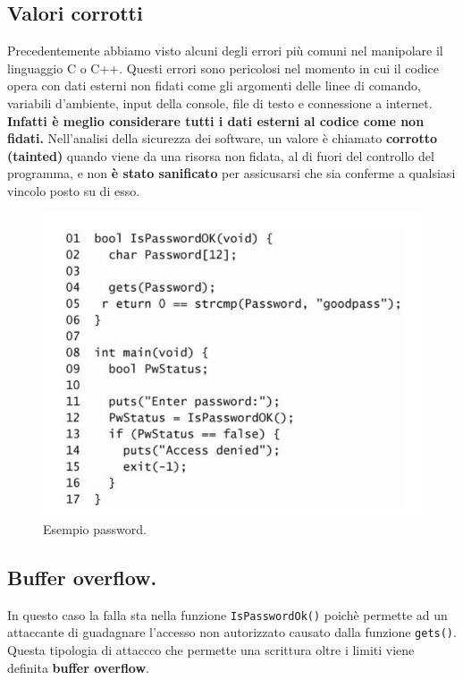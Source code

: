 \subsection{Valori corrotti}
Precedentemente abbiamo visto alcuni degli errori più comuni nel manipolare il linguaggio C o C++. Questi errori sono pericolosi nel momento in cui il codice opera con dati esterni non fidati come gli argomenti delle linee di comando, variabili d'ambiente, input della console, file di testo e connessione a internet. \textbf{Infatti è meglio considerare tutti i dati esterni al codice come non fidati. } Nell'analisi della sicurezza dei software, un valore è chiamato \textbf{corrotto (tainted)} quando viene da una risorsa non fidata, al di fuori del controllo del programma, e non \textbf{è stato sanificato} per assicusarsi che sia conferme a qualsiasi vincolo posto su di esso. 
\begin{figure}[H]
	\centering
    \includegraphics[width=14cm, keepaspectratio]{santini/img/cap_2/password_example.png}
	\caption{Esempio password.}\label{fig:password}
\end{figure}

\subsection{Buffer overflow.}
In questo caso la falla sta nella funzione \verb|IsPasswordOk()| poichè permette ad un attaccante di guadagnare l'accesso non autorizzato causato dalla funzione \verb|gets()|. Questa tipologia di attaccco che permette una scrittura oltre i limiti viene definita \textbf{buffer overflow}.                         

